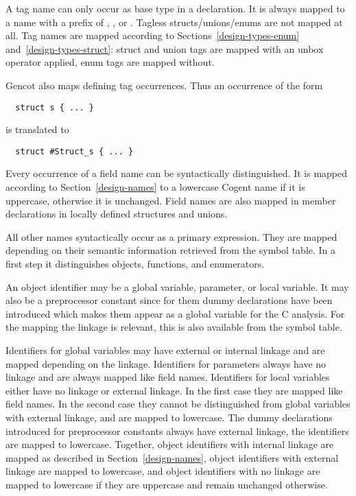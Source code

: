 A tag name can only occur as base type in a declaration. It is always mapped to a name with a prefix 
of , , or . Tagless structs/unions/enums are not mapped at all.
Tag names are mapped according to Sections~\ref{design-types-enum} and~\ref{design-types-struct}: struct
and union tags are mapped with an unbox operator applied, enum tags are mapped without.

Gencot also maps defining tag occurrences. Thus an occurrence of the form 
\begin{verbatim}
  struct s { ... }
\end{verbatim}
is translated to
\begin{verbatim}
  struct #Struct_s { ... }
\end{verbatim}

Every occurrence of a field name can be syntactically distinguished. It is mapped according to 
Section~\ref{design-names} to a lowercase Cogent name if it is uppercase, otherwise it is unchanged.
Field names are also mapped in member declarations in locally defined structures and unions.

All other names syntactically occur as a primary expression. They are mapped depending on their semantic
information retrieved from the symbol table. In a first step it distinguishes objects, functions, 
and enumerators.

An object identifier may be a global variable, parameter, or local variable. It may also be a preprocessor 
constant since for them dummy declarations have been introduced which makes them appear as a global variable
for the C analysis. For the mapping the linkage is relevant, this is also available from the symbol table.

Identifiers for global variables may have external or internal linkage and are mapped depending on the
linkage. Identifiers for parameters always have no linkage and are always mapped like field names. Identifiers
for local variables either have no linkage or external linkage. In the first case they are mapped like
field names. In the second case they cannot be distinguished from global variables with external linkage,
and are mapped to lowercase. The dummy declarations introduced for preprocessor constants
always have external linkage, the identifiers are mapped to lowercase. Together, object identifiers with 
internal linkage are mapped as described in Section~\ref{design-names}, object identifiers with external
linkage are mapped to lowercase, and object identifiers with no linkage are mapped to lowercase if they are
uppercase and remain unchanged otherwise.


